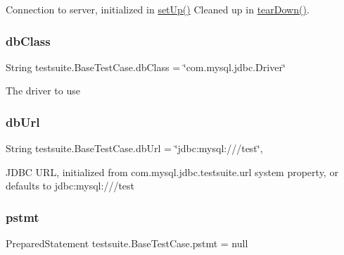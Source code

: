 Connection to server, initialized in \mbox{\hyperlink{classtestsuite_1_1_base_test_case_a195f5d285c7979328734606d08ad15b1}{set\+Up()}} Cleaned up in \mbox{\hyperlink{classtestsuite_1_1_base_test_case_a51c7d76ab24b0c966f956250fd7a4f52}{tear\+Down()}}. \mbox{\label{classtestsuite_1_1_base_test_case_ab78915f48e4a877fab1ace666b20f68a}} 
\subsubsection{\texorpdfstring{db\+Class}{dbClass}}
{\footnotesize\ttfamily String testsuite.\+Base\+Test\+Case.\+db\+Class = \char`\"{}com.\+mysql.\+jdbc.\+Driver\char`\"{}\hspace{0.3cm}{\ttfamily [protected]}}

The driver to use \mbox{\label{classtestsuite_1_1_base_test_case_abf615dd75e2b0bff6538d49bcc34541c}} 
\subsubsection{\texorpdfstring{db\+Url}{dbUrl}}
{\footnotesize\ttfamily String testsuite.\+Base\+Test\+Case.\+db\+Url = \char`\"{}jdbc\+:mysql\+:///test\char`\"{}\hspace{0.3cm}{\ttfamily [static]}, {\ttfamily [protected]}}

J\+D\+BC U\+RL, initialized from com.\+mysql.\+jdbc.\+testsuite.\+url system property, or defaults to jdbc\+:mysql\+:///test \mbox{\label{classtestsuite_1_1_base_test_case_ad11201d39ce60fd541a261cac7d9a889}} 
\subsubsection{\texorpdfstring{pstmt}{pstmt}}
{\footnotesize\ttfamily Prepared\+Statement testsuite.\+Base\+Test\+Case.\+pstmt = null\hspace{0.3cm}{\ttfamily [protected]}}

